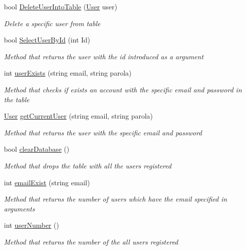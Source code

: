 \begin{DoxyCompactItemize}
bool \hyperlink{classst_delivery_1_1_database_a8f2fe918677772e104ead36f935e6aa4}{Delete\+User\+Into\+Table} (\hyperlink{classst_delivery_1_1_user}{User} user)
\begin{DoxyCompactList}\small\item\em Delete a specific user from table \end{DoxyCompactList}\item 
bool \hyperlink{classst_delivery_1_1_database_a44f6c1008ab4a8c9cc778e424aa23290}{Select\+User\+By\+Id} (int Id)
\begin{DoxyCompactList}\small\item\em Method that returns the user with the id introduced as a argument \end{DoxyCompactList}\item 
int \hyperlink{classst_delivery_1_1_database_afa81257b192afc5091c35e8af8e1cf09}{user\+Exists} (string email, string parola)
\begin{DoxyCompactList}\small\item\em Method that checks if exists an account with the specific email and password in the table \end{DoxyCompactList}\item 
\hyperlink{classst_delivery_1_1_user}{User} \hyperlink{classst_delivery_1_1_database_a860528216ec870d55b4b37a3400c9cf4}{get\+Current\+User} (string email, string parola)
\begin{DoxyCompactList}\small\item\em Method that returns the user with the specific email and password \end{DoxyCompactList}\item 
bool \hyperlink{classst_delivery_1_1_database_ad06ec86e4219cfa71dd3aaf34ee456b4}{clear\+Database} ()
\begin{DoxyCompactList}\small\item\em Method that drops the table with all the users registered \end{DoxyCompactList}\item 
int \hyperlink{classst_delivery_1_1_database_adf411e30963819101ad97c16caa00ff6}{email\+Exist} (string email)
\begin{DoxyCompactList}\small\item\em Method that returns the number of users which have the email specified in arguments \end{DoxyCompactList}\item 
int \hyperlink{classst_delivery_1_1_database_a150234bbfd66c0a5b2067de2ddc851cc}{user\+Number} ()
\begin{DoxyCompactList}\small\item\em Method that returns the number of the all users registered \end{DoxyCompactList}\end{DoxyCompactItemize}
